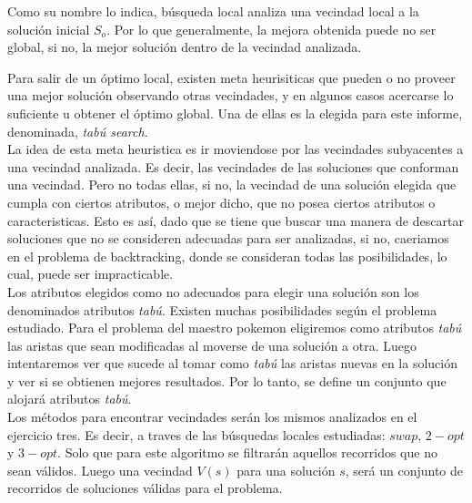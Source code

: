 Como su nombre lo indica, búsqueda local analiza una vecindad local a la solución inicial $S_o$. Por lo que generalmente, la mejora obtenida puede no ser global, si no, la mejor solución dentro de la vecindad analizada. 

Para salir de un óptimo local, existen meta heurisiticas que pueden o no proveer una mejor solución observando otras vecindades, y en algunos casos acercarse lo suficiente u obtener el óptimo global. Una de ellas es la elegida para este informe, denominada, \textit{tab\'u search}.\\

La idea de esta meta heuristica es ir moviendose por las vecindades subyacentes a una vecindad analizada. Es decir, las vecindades de las soluciones que conforman una vecindad.
Pero no todas ellas, si no, la vecindad de una solución elegida que cumpla con ciertos atributos, o mejor dicho, que no posea ciertos atributos o caracteristicas. 
Esto es así, dado que se tiene que buscar una manera de descartar soluciones que no se consideren adecuadas para ser analizadas, si no, caeriamos en el problema de backtracking, donde se consideran todas las posibilidades, lo cual, puede ser impracticable.\\

Los atributos elegidos como no adecuados para elegir una solución son los denominados atributos \textit{tab\'u}. Existen muchas posibilidades según el problema estudiado. Para el problema del maestro pokemon eligiremos como atributos \textit{tabú} las aristas que sean modificadas al moverse de una solución a otra. Luego intentaremos ver que sucede al tomar como \textit{tabú} las aristas nuevas en la solución y ver si se obtienen mejores resultados.
Por lo tanto, se define un conjunto que alojará atributos \textit{tabú}.\\

Los métodos para encontrar vecindades serán los mismos analizados en el ejercicio tres. Es decir, a traves de las búsquedas locales estudiadas: $swap$, $2-opt$ y $3-opt$. Solo que para este algoritmo se filtrarán aquellos recorridos que no sean válidos. Luego una vecindad $V(s)$ para una solución $s$, será un conjunto de recorridos de soluciones válidas para el problema.\\

